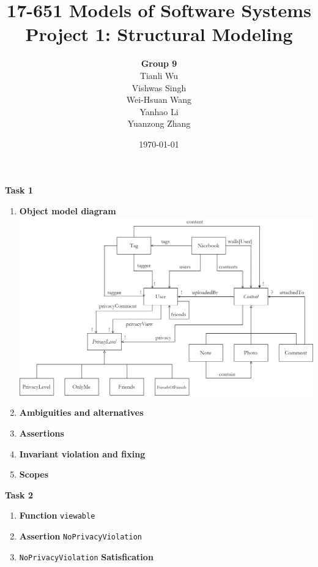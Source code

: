 \documentclass[titlepage]{article}
\begin{document}
\title{17-651 Models of Software Systems\\[1ex] Project 1: Structural Modeling}
\author{
    {\Large\textbf{Group 9}}\\[3ex]
    Tianli Wu\\[1ex]
    Vishwas Singh\\[1ex]
    Wei-Hsuan Wang\\[1ex]
    Yanhao Li\\[1ex]
    Yuanzong Zhang\\[1ex]
}
\date{\today}
\maketitle
\bf\LARGE{Task 1}
\begin{enumerate}[\bf\Large 1.]
    \item \bf\Large{Object model diagram}\\
        \includegraphics[width=6in]{nicebook.jpg}
    \item \bf\Large{Ambiguities and alternatives}
    \item \bf\Large{Assertions}
    \item \bf\Large{Invariant violation and fixing}
    \item \bf\Large{Scopes}
\end{enumerate}
\bf\LARGE{Task 2}
\begin{enumerate}[\bf\Large 1.]
    \item {\bf\Large{Function}} \texttt{viewable}
    \item {\bf\Large{Assertion}} \texttt{NoPrivacyViolation}
    \item \texttt{NoPrivacyViolation} {\bf\Large{Satisfication}}
\end{enumerate}
\end{document}
